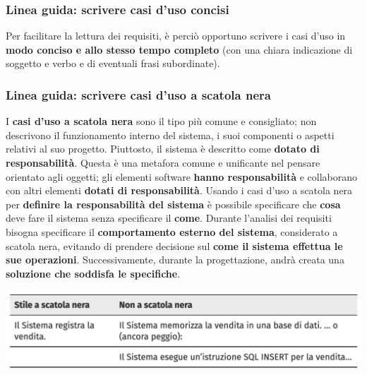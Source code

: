\documentclass[12pt]{article}
\begin{document}
\subsubsection{Linea guida: scrivere casi d'uso concisi}
Per facilitare la lettura dei requisiti, è perciò opportuno scrivere i casi d'uso in \textbf{modo conciso e allo stesso tempo completo} (con una chiara indicazione di soggetto e verbo e di eventuali frasi subordinate).
\subsubsection{Linea guida: scrivere casi d'uso a scatola nera}
I \textbf{casi d'uso a scatola nera} sono il tipo più comune e consigliato; non descrivono il funzionamento interno del sistema, i suoi componenti o aspetti relativi al suo progetto.
Piuttosto, il sistema è descritto come \textbf{dotato di responsabilità}. Questa è una metafora comune e unificante nel pensare orientato agli oggetti;
gli elementi software \textbf{hanno responsabilità} e collaborano con altri elementi \textbf{dotati di responsabilità}.
Usando i casi d'uso a scatola nera per \textbf{definire la responsabilità del sistema} è possibile specificare che \textbf{cosa} deve fare il sistema senza specificare il \textbf{come}.
Durante l'analisi dei requisiti bisogna specificare il \textbf{comportamento esterno del sistema}, considerato a scatola nera, evitando di prendere decisione sul \textbf{come il sistema effettua le sue operazioni}.
Successivamente, durante la progettazione, andrà creata una \textbf{soluzione che soddisfa le specifiche}.
\begin{center}
    \includegraphics[width = 1\textwidth]{Images/35.png}
\end{center}
\end{document}
